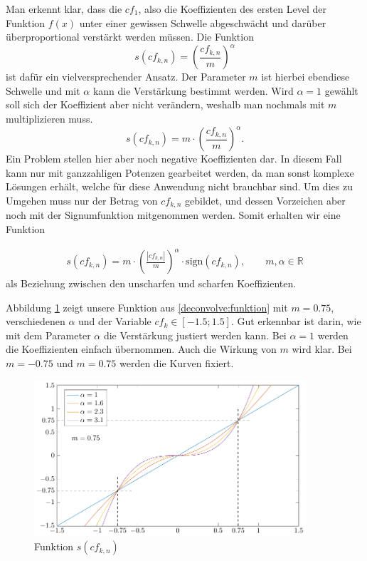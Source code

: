 Man erkennt klar, dass die $cf_1$, also die Koeffizienten des ersten Level der Funktion $f(x)$ unter einer gewissen Schwelle abgeschwächt und darüber überproportional verstärkt werden müssen.
Die Funktion
$$s(cf_{k,n}) = \left( \frac{cf_{k,n}}{m}\right)^\alpha$$
ist dafür ein vielversprechender Ansatz.
Der Parameter $m$ ist hierbei ebendiese Schwelle und mit $\alpha$ kann die Verstärkung bestimmt werden.
Wird $\alpha = 1$ gewählt soll sich der Koeffizient aber nicht verändern, weshalb man nochmals mit $m$ multiplizieren muss.
$$s(cf_{k,n}) = m\cdot \left( \frac{cf_{k,n}}{m}\right)^\alpha.$$
Ein Problem stellen hier aber noch negative Koeffizienten dar. In diesem Fall kann nur mit ganzzahligen Potenzen gearbeitet werden, da man sonst komplexe Lösungen erhält, welche für diese Anwendung nicht brauchbar sind.
Um dies zu Umgehen muss nur der Betrag von $cf_{k,n}$ gebildet, und dessen Vorzeichen aber noch mit der Signumfunktion mitgenommen werden.
Somit erhalten wir eine Funktion

\begin{align}
s(cf_{k,n})=m\cdot \left(\frac{|cf_{k,n}|}{m}\right)^{\alpha}\cdot \text{sign}(cf_{k,n}), \qquad m,\alpha\in\mathbb{R}
\label{deconvolve:funktion}
\end{align}
als Beziehung zwischen den \glqq unscharfen\grqq{} und \glqq scharfen\grqq{} Koeffizienten.

Abbildung \ref{deconvolve:function} zeigt unsere Funktion aus \eqref{deconvolve:funktion} mit $m=0.75$, verschiedenen $\alpha$ und der Variable $cf_k\in[-1.5;1.5]$.
Gut erkennbar ist darin, wie mit dem Parameter $\alpha$ die Verstärkung justiert werden kann.
Bei $\alpha = 1$ werden die Koeffizienten einfach übernommen.
Auch die Wirkung von $m$ wird klar.
Bei $m=-0.75$ und $m=0.75$ werden die Kurven fixiert.
\begin{figure}[h]
\centering
\includegraphics[width=0.9\textwidth]{./papers/deconvolve/pictures/function.pdf}
\caption{Funktion $s(cf_{k,n})$\label{deconvolve:function}}
\end{figure}

